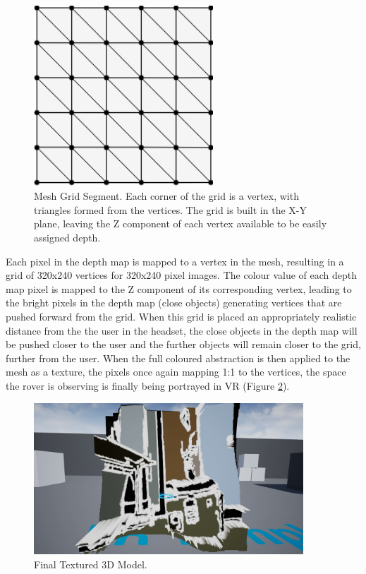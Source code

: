 \begin{figure}[H]
    \begin{center}
      \includegraphics[width=0.6\textwidth]{Figures/mesh.png}
      \caption[Mesh Grid Segment]{Mesh Grid Segment. Each corner of the grid is a vertex, with triangles formed from the vertices. The grid is built in the X-Y plane, leaving the Z component of each vertex available to be easily assigned depth.}
      \label{fig:mesh}
    \end{center}
\end{figure}

Each pixel in the depth map is mapped to a vertex in the mesh, resulting in a grid of 320x240 vertices for 320x240 pixel images. The colour value of each depth map pixel is mapped to the Z component of its corresponding vertex, leading to the bright pixels in the depth map (close objects) generating vertices that are pushed forward from the grid. When this grid is placed an appropriately realistic distance from the the user in the headset, the close objects in the depth map will be pushed closer to the user and the further objects will remain closer to the grid, further from the user. When the full coloured abstraction is then applied to the mesh as a texture, the pixels once again mapping 1:1 to the vertices, the space the rover is observing is finally being portrayed in VR (Figure \ref{fig:3DModel}).

\begin{figure}[H]
    \begin{center}
      \includegraphics[width=0.9\textwidth]{Figures/OutlinePic2.png}
      \caption[Final Textured 3D Model]{Final Textured 3D Model.}
      \label{fig:3DModel}
    \end{center}
\end{figure}